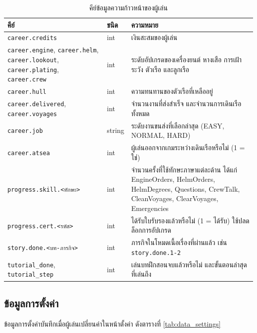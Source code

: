 \begin{table}[!htbp]
\centering
\caption{คีย์ข้อมูลความก้าวหน้าของผู้เล่น}
\label{tab:data_progress}
\begin{tabular}{|L{4.46cm}|L{1.55cm}|L{7.27cm}|}
\hline
\textbf{คีย์} & \textbf{ชนิด} & \textbf{ความหมาย} \\
\hline
\texttt{career.\allowbreak credits} & int & เงินสะสมของผู้เล่น \\ \hline
\texttt{career.\allowbreak engine}, \texttt{career.\allowbreak helm}, \texttt{career.\allowbreak lookout}, \texttt{career.\allowbreak plating}, \texttt{career.\allowbreak crew} & int & ระดับอัปเกรดของเครื่องยนต์ หางเสือ การเฝ้าระวัง ตัวเรือ และลูกเรือ \\ \hline
\texttt{career.\allowbreak hull} & int & ความทนทานของตัวเรือที่เหลืออยู่ \\ \hline
\texttt{career.\allowbreak delivered}, \texttt{career.\allowbreak voyages} & int & จำนวนงานที่ส่งสำเร็จ และจำนวนการเดินเรือทั้งหมด \\ \hline
\texttt{career.\allowbreak job} & string & ระดับงานขนส่งที่เลือกล่าสุด (EASY, NORMAL, HARD) \\ \hline
\texttt{career.\allowbreak atsea} & int & ผู้เล่นออกจากเกมระหว่างเดินเรือหรือไม่ (1 = ใช่) \\ \hline
\texttt{progress.\allowbreak skill.\allowbreak <ทักษะ>} & int & จำนวนครั้งที่ใช้ทักษะภาษาแต่ละด้าน ได้แก่ EngineOrders, HelmOrders, HelmDegrees, Questions, CrewTalk, CleanVoyages, ClearVoyages, Emergencies \\ \hline
\texttt{progress.\allowbreak cert.\allowbreak <รหัส>} & int & ได้รับใบรับรองแล้วหรือไม่ (1 = ได้รับ) ใช้ปลดล็อกการอัปเกรด \\ \hline
\texttt{story.\allowbreak done.\allowbreak <บท-ภารกิจ>} & int & ภารกิจในโหมดเนื้อเรื่องที่ผ่านแล้ว เช่น \texttt{story.\allowbreak done.1-2} \\ \hline
\texttt{tutorial\_\allowbreak done}, \texttt{tutorial\_\allowbreak step} & int & เล่นบทฝึกสอนจบแล้วหรือไม่ และขั้นตอนล่าสุดที่เล่นถึง \\
\hline
\end{tabular}
\end{table}

\subsection{ข้อมูลการตั้งค่า}

ข้อมูลการตั้งค่าบันทึกเมื่อผู้เล่นเปลี่ยนค่าในหน้าตั้งค่า ดังตารางที่ \ref{tab:data_settings}

